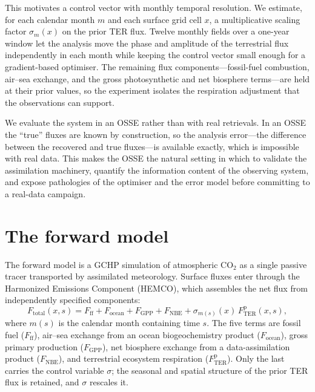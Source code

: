 \documentclass[12pt]{article}
\newcommand{\co}{\mathrm{CO}_2}
\newcommand{\Fprior}{F^{\mathrm{p}}}
\begin{document}
This motivates a control vector with monthly temporal resolution. We estimate,
for each calendar month $m$ and each surface grid cell $x$, a multiplicative
scaling factor $\sigma_m(x)$ on the prior TER flux. Twelve monthly fields over a
one-year window let the analysis move the phase and amplitude of the terrestrial
flux independently in each month while keeping the control vector small enough
for a gradient-based optimiser. The remaining flux components---fossil-fuel
combustion, air--sea exchange, and the gross photosynthetic and net biosphere
terms---are held at their prior values, so the experiment isolates the
respiration adjustment that the observations can support.

We evaluate the system in an OSSE rather than with real retrievals. In an OSSE
the ``true'' fluxes are known by construction, so the analysis error---the
difference between the recovered and true fluxes---is available exactly, which
is impossible with real data. This makes the OSSE the natural setting in which
to validate the assimilation machinery, quantify the information content of the
observing system, and expose pathologies of the optimiser and the error model
before committing to a real-data campaign.

\section{The forward model}

The forward model is a GCHP simulation of atmospheric $\co$ as a single passive
tracer transported by assimilated meteorology. Surface fluxes enter through the
Harmonized Emissions Component (HEMCO), which assembles the net flux from
independently specified components:
%
\begin{equation}
  F_{\mathrm{total}}(x,s) = F_{\mathrm{ff}} + F_{\mathrm{ocean}}
     + F_{\mathrm{GPP}} + F_{\mathrm{NBE}}
     + \sigma_{m(s)}(x)\,\Fprior_{\mathrm{TER}}(x,s),
  \label{eq:fluxsum}
\end{equation}
%
where $m(s)$ is the calendar month containing time $s$. The five terms are
fossil fuel ($F_{\mathrm{ff}}$), air--sea exchange from an ocean biogeochemistry
product ($F_{\mathrm{ocean}}$), gross primary production ($F_{\mathrm{GPP}}$),
net biosphere exchange from a data-assimilation product ($F_{\mathrm{NBE}}$),
and terrestrial ecosystem respiration ($\Fprior_{\mathrm{TER}}$). Only the last
carries the control variable $\sigma$; the seasonal and spatial structure of the
prior TER flux is retained, and $\sigma$ rescales it.
\end{document}
